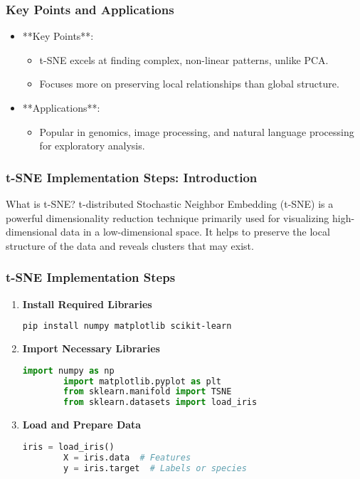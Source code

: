 \documentclass[aspectratio=169]{beamer}
\begin{document}
\begin{frame}[fragile]
    \frametitle{Key Points and Applications}
    \begin{itemize}
        \item **Key Points**:
        \begin{itemize}
            \item t-SNE excels at finding complex, non-linear patterns, unlike PCA.
            \item Focuses more on preserving local relationships than global structure.
        \end{itemize}
        \item **Applications**:
        \begin{itemize}
            \item Popular in genomics, image processing, and natural language processing for exploratory analysis.
        \end{itemize}
    \end{itemize}
\end{frame}

\begin{frame}[fragile]
    \frametitle{t-SNE Implementation Steps: Introduction}
    \begin{block}{What is t-SNE?}
        t-distributed Stochastic Neighbor Embedding (t-SNE) is a powerful dimensionality reduction technique primarily used for visualizing high-dimensional data in a low-dimensional space. It helps to preserve the local structure of the data and reveals clusters that may exist.
    \end{block}
\end{frame}

\begin{frame}[fragile]
    \frametitle{t-SNE Implementation Steps}
    \begin{enumerate}
        \item \textbf{Install Required Libraries}
        \begin{lstlisting}[language=bash]
        pip install numpy matplotlib scikit-learn
        \end{lstlisting}
        
        \item \textbf{Import Necessary Libraries}
        \begin{lstlisting}[language=python]
        import numpy as np
        import matplotlib.pyplot as plt
        from sklearn.manifold import TSNE
        from sklearn.datasets import load_iris
        \end{lstlisting}
        
        \item \textbf{Load and Prepare Data}
        \begin{lstlisting}[language=python]
        iris = load_iris()
        X = iris.data  # Features
        y = iris.target  # Labels or species
        \end{lstlisting}
    \end{enumerate}
\end{frame}
\end{document}

